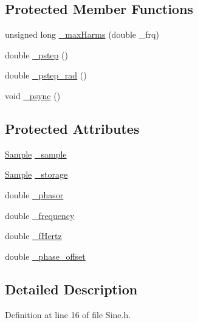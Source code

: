 \subsection*{Protected Member Functions}
\begin{DoxyCompactItemize}
\item 
unsigned long \hyperlink{class_signal_1_1_classic_generator_a7457e912d428de4e3fc27ec7fc49890e}{\+\_\+max\+Harms} (double \+\_\+frq)
\item 
double \hyperlink{class_signal_1_1_classic_generator_a255330ce8049b6e6d101b8d356cebe3d}{\+\_\+pstep} ()
\item 
double \hyperlink{class_signal_1_1_classic_generator_a6571276f584ff0be3862243d0f103a92}{\+\_\+pstep\+\_\+rad} ()
\item 
void \hyperlink{class_signal_1_1_classic_generator_a6454565b655bff7b8335735c2fabb4af}{\+\_\+psync} ()
\end{DoxyCompactItemize}
\subsection*{Protected Attributes}
\begin{DoxyCompactItemize}
\item 
\hyperlink{class_signal_1_1_sample}{Sample} \hyperlink{class_signal_1_1_classic_generator_a40313d0d806d6e44af7d41b3ef3a0822}{\+\_\+sample}
\item 
\hyperlink{class_signal_1_1_sample}{Sample} \hyperlink{class_signal_1_1_classic_generator_a1214faf589eccb01631700723900bbf9}{\+\_\+storage}
\item 
double \hyperlink{class_signal_1_1_classic_generator_ade9b66bc49d2d2f40a1390fc6374b8b2}{\+\_\+phasor}
\item 
double \hyperlink{class_signal_1_1_signal_generator_a7f107461333bce68c5dad412db96a8c2}{\+\_\+frequency}
\item 
double \hyperlink{class_signal_1_1_signal_generator_a85a4702347352bab1c71e0a8df8437d6}{\+\_\+f\+Hertz}
\item 
double \hyperlink{class_signal_1_1_signal_generator_a6b4444d46747c8517171edbbf4b5588f}{\+\_\+phase\+\_\+offset}
\end{DoxyCompactItemize}


\subsection{Detailed Description}


Definition at line 16 of file Sine.\+h.



